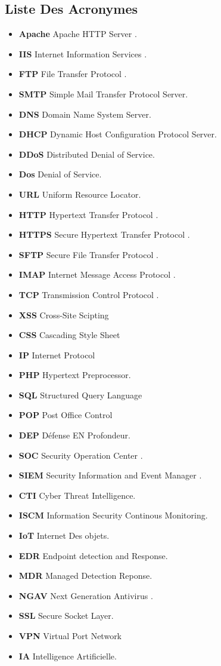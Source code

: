 \tableofcontents
\begin{center}
	\chapter*{Liste Des Acronymes}
	\begin{itemize}
		\item \textbf{Apache} Apache HTTP Server .
		\item \textbf{IIS} Internet Information Services .
		\item \textbf{FTP} File Transfer Protocol .
		\item  \textbf{SMTP} Simple Mail Transfer Protocol  Server.
		\item \textbf{DNS}  Domain Name System  Server.
		\item \textbf{DHCP} Dynamic Host Configuration Protocol  Server.
		\item \textbf{DDoS } Distributed Denial of Service.
		\item \textbf{Dos} Denial of Service.
		\item \textbf{URL} Uniform Resource Locator.
		\item  \textbf{HTTP} Hypertext Transfer Protocol .
		\item \textbf{HTTPS} Secure Hypertext Transfer Protocol .
		\item \textbf{SFTP} Secure File Transfer Protocol  .
		\item  \textbf{IMAP} Internet Message Access Protocol .
		\item \textbf{TCP} Transmission Control Protocol .
		\item  \textbf{XSS} Cross-Site Scipting
		\item  \textbf{CSS} Cascading Style Sheet
		\item \textbf{IP} Internet Protocol
		\item  \textbf{PHP} Hypertext Preprocessor.
		\item \textbf{SQL} Structured Query Language
		\item \textbf{POP} Post Office Control
		\item  \textbf{DEP} Défense EN Profondeur.
		\item \textbf{SOC} Security Operation Center .
		\item \textbf{SIEM} Security Information and Event Manager .
		\item \textbf{CTI} Cyber Threat Intelligence.
		\item \textbf{ISCM} Information Security Continous Monitoring.
		\item \textbf{IoT} Internet Des objets.
		\item \textbf{EDR} Endpoint detection and Response.
		\item \textbf{MDR} Managed Detection Reponse.
		\item \textbf{NGAV} Next Generation Antivirus .
		\item \textbf{SSL} Secure Socket Layer.
		\item \textbf{VPN} Virtual Port Network
		\item \textbf{IA} Intelligence Artificielle.
		
		
	\end{itemize}
	
\end{center}
